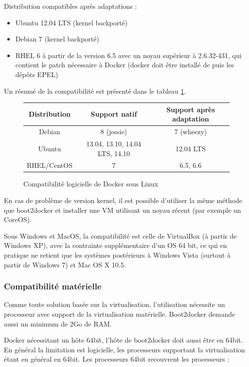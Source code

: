\documentclass[a4paper,11pt]{report}
\begin{document}
Distribution compatibles après adaptations :
\begin{itemize}
  \item Ubuntu 12.04 LTS (kernel backporté)
  \item Debian 7 (kernel backporté)
  \item RHEL 6 à partir de la version 6.5 avec un noyau supérieur à 2.6.32-431, qui contient le patch nécessaire à Docker (docker doit être installé de puis les dépôts EPEL)
\end{itemize}

Un résumé de la compatibilité est présenté dans le tableau \ref{tab-linux}.

\begin{figure}[h!]
\begin{center}
  \begin{tabular}{| c | c | c | }
     \hline
     Distribution & Support natif & Support après adaptation \\ \hline
     Debian & 8 (jessie) & 7 (wheezy) \\ \hline
     Ubuntu & 13.04, 13.10, 14.04 LTS, 14.10 & 12.04 LTS \\ \hline
     RHEL/CentOS & 7 & 6.5, 6.6 \\
     \hline
   \end{tabular}
      \end{center}
  \caption{Compatibilité logicielle de Docker sous Linux}
  \label{tab-linux}
\end{figure}

En cas de problème de version kernel, il est possible d'utiliser la même méthode que boot2docker et installer une VM utilisant un noyau récent (par exemple un CoreOS).

Sous Windows et MacOS, la compatibilité est celle de VirtualBox (à partir de Windows XP), avec la contrainte supplémentaire d'un OS 64 bit, ce qui en pratique ne retient que les systèmes postérieurs à Windows Vista (surtout à partir de Windows 7) et Mac OS X 10.5. 

\subsubsection{Compatibilité matérielle}

Comme toute solution basée sur la virtualisation, l'utilisation nécessite un processeur avec support de la virtualisation matérielle. Boot2docker demande aussi un minimum de 2Go de RAM.

Docker nécessitant un hôte 64bit, l'hôte de boot2docker doit aussi être en 64bit. En général la limitation est logicielle, les processeurs supportant la virtualisation étant en général en 64bit. Les processeurs 64bit recouvrent les processeurs :
\end{document}
